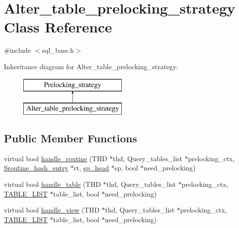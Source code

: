 \hypertarget{classAlter__table__prelocking__strategy}{}\section{Alter\+\_\+table\+\_\+prelocking\+\_\+strategy Class Reference}
\label{classAlter__table__prelocking__strategy}


{\ttfamily \#include $<$sql\+\_\+base.\+h$>$}

Inheritance diagram for Alter\+\_\+table\+\_\+prelocking\+\_\+strategy\+:\begin{figure}[H]
\begin{center}
\leavevmode
\includegraphics[height=2.000000cm]{classAlter__table__prelocking__strategy}
\end{center}
\end{figure}
\subsection*{Public Member Functions}
\begin{DoxyCompactItemize}
\item 
virtual bool \mbox{\hyperlink{group__Data__Dictionary_ga7e0d0312d3f9e2abb42e91b74f045d79}{handle\+\_\+routine}} (T\+HD $\ast$thd, Query\+\_\+tables\+\_\+list $\ast$prelocking\+\_\+ctx, \mbox{\hyperlink{classSroutine__hash__entry}{Sroutine\+\_\+hash\+\_\+entry}} $\ast$rt, \mbox{\hyperlink{classsp__head}{sp\+\_\+head}} $\ast$sp, bool $\ast$need\+\_\+prelocking)
\item 
virtual bool \mbox{\hyperlink{group__Data__Dictionary_ga572cfaf98399c14ebe9e318b4197c6f5}{handle\+\_\+table}} (T\+HD $\ast$thd, Query\+\_\+tables\+\_\+list $\ast$prelocking\+\_\+ctx, \mbox{\hyperlink{structTABLE__LIST}{T\+A\+B\+L\+E\+\_\+\+L\+I\+ST}} $\ast$table\+\_\+list, bool $\ast$need\+\_\+prelocking)
\item 
virtual bool \mbox{\hyperlink{group__Data__Dictionary_ga3da56b0df4158af2defc12e836983529}{handle\+\_\+view}} (T\+HD $\ast$thd, Query\+\_\+tables\+\_\+list $\ast$prelocking\+\_\+ctx, \mbox{\hyperlink{structTABLE__LIST}{T\+A\+B\+L\+E\+\_\+\+L\+I\+ST}} $\ast$table\+\_\+list, bool $\ast$need\+\_\+prelocking)
\end{DoxyCompactItemize}


